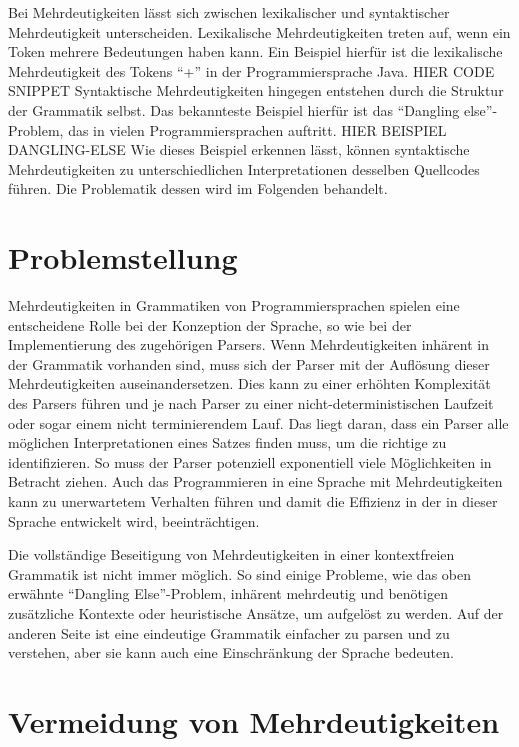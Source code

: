 \documentclass[runningheads]{llncs}
\begin{document}
	Bei Mehrdeutigkeiten lässt sich zwischen lexikalischer und syntaktischer Mehrdeutigkeit unterscheiden.
	Lexikalische Mehrdeutigkeiten treten auf, wenn ein Token mehrere Bedeutungen haben kann.
	Ein Beispiel hierfür ist die lexikalische Mehrdeutigkeit des Tokens ``+'' in der Programmiersprache Java.
	HIER CODE SNIPPET
	Syntaktische Mehrdeutigkeiten hingegen entstehen durch die Struktur der Grammatik selbst.
	Das bekannteste Beispiel hierfür ist das ``Dangling else''-Problem, das in vielen Programmiersprachen auftritt.
	HIER BEISPIEL DANGLING-ELSE
	Wie dieses Beispiel erkennen lässt,
	können syntaktische Mehrdeutigkeiten zu unterschiedlichen Interpretationen desselben Quellcodes führen.
	Die Problematik dessen wird im Folgenden behandelt.


	\section{Problemstellung}

	Mehrdeutigkeiten in Grammatiken von Programmiersprachen
	spielen eine entscheidene Rolle bei der Konzeption der Sprache,
	so wie bei der Implementierung des zugehörigen Parsers.
	Wenn Mehrdeutigkeiten inhärent in der Grammatik vorhanden sind,
	muss sich der Parser mit der Auflösung dieser Mehrdeutigkeiten auseinandersetzen.
	Dies kann zu einer erhöhten Komplexität des Parsers führen
	und je nach Parser zu einer nicht-deterministischen Laufzeit oder sogar einem nicht terminierendem Lauf.
	Das liegt daran, dass ein Parser alle möglichen Interpretationen eines Satzes finden muss, um die richtige zu identifizieren.
	So muss der Parser potenziell exponentiell viele Möglichkeiten in Betracht ziehen.
	Auch das Programmieren in eine Sprache mit Mehrdeutigkeiten kann zu unerwartetem Verhalten führen
	und damit die Effizienz in der in dieser Sprache entwickelt wird, beeinträchtigen.

	Die vollständige Beseitigung von Mehrdeutigkeiten in einer kontextfreien Grammatik ist nicht immer möglich.
	So sind einige Probleme, wie das oben erwähnte ``Dangling Else''-Problem,
	inhärent mehrdeutig und benötigen zusätzliche Kontexte oder heuristische Ansätze, um aufgelöst zu werden.
	Auf der anderen Seite ist eine eindeutige Grammatik einfacher zu parsen und zu verstehen,
	aber sie kann auch eine Einschränkung der Sprache bedeuten.


	\section{Vermeidung von Mehrdeutigkeiten}
\end{document}
